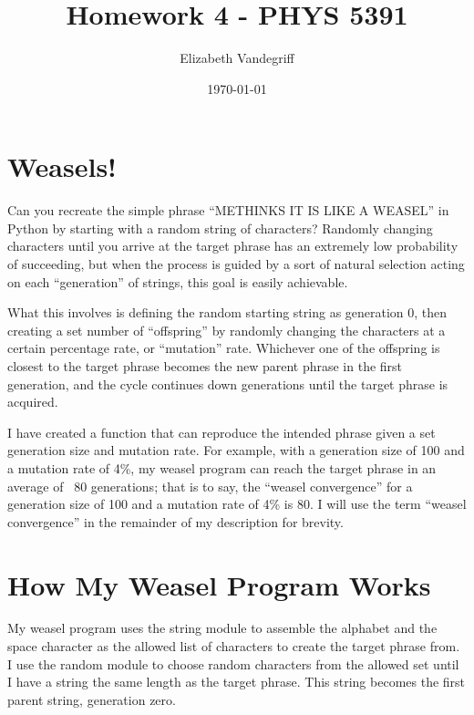 \documentclass[12pt, letterpaper]{article}
\begin{document}
\title{Homework 4 - PHYS 5391}
\author{Elizabeth Vandegriff}
\date{\today}

\maketitle
\newpage
\tableofcontents
\newpage

\section{Weasels!}

Can you recreate the simple phrase ``METHINKS IT IS LIKE A WEASEL'' in Python by starting with a random string of characters? Randomly changing characters until you arrive at the target phrase has an extremely low probability of succeeding, but when the process is guided by a sort of natural selection acting on each ``generation'' of strings, this goal is easily achievable.

What this involves is defining the random starting string as generation 0, then creating a set number of ``offspring'' by randomly changing the characters at a certain percentage rate, or ``mutation'' rate. Whichever one of the offspring is closest to the target phrase becomes the new parent phrase in the first generation, and the cycle continues down generations until the target phrase is acquired.

I have created a function that can reproduce the intended phrase given a set generation size and mutation rate. For example, with a generation size of 100 and a mutation rate of 4\%, my weasel program can reach the target phrase in an average of ~80 generations; that is to say, the ``weasel convergence'' for a generation size of 100 and a mutation rate of 4\% is 80. I will use the term ``weasel convergence'' in the remainder of my description for brevity.

\section{How My Weasel Program Works}

My weasel program uses the string module to assemble the alphabet and the space character as the allowed list of characters to create the target phrase from. I use the random module to choose random characters from the allowed set until I have a string the same length as the target phrase. This string becomes the first parent string, generation zero.
\end{document}
